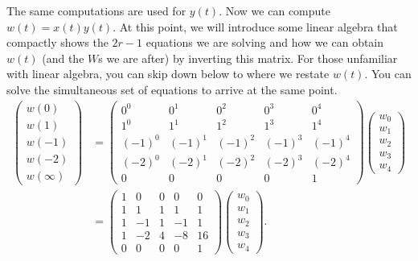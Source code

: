\documentclass[psamsfonts,reqno]{amsart}
\theoremstyle{definition}
\theoremstyle{remark}
\numberwithin{equation}{section}
\begin{document}
The same computations are used for $y(t)$. Now we can compute $w(t) = x(t)y(t)$. At this point, we will introduce some linear algebra that compactly shows the $2r-1$ equations we are solving and how we can obtain $w(t)$ (and the $W$s we are after) by inverting this matrix. For those unfamiliar with linear algebra, you can skip down below to where we restate $w(t)$. You can solve the simultaneous set of equations to arrive at the same point.
\begin{align*}
	\begin{pmatrix}
		w(0) \\ 
		w(1) \\
		w(-1) \\
		w(-2) \\
		w(\infty)
	\end{pmatrix}
	&=
	\begin{pmatrix}
		0^0 & 0^1 & 0^2 & 0^3 & 0^4 \\
		1^0 & 1^1 & 1^2 & 1^3 & 1^4 \\
		(-1)^0 & (-1)^1 & (-1)^2 & (-1)^3 & (-1)^4 \\
		(-2)^0 & (-2)^1 & (-2)^2 & (-2)^3 & (-2)^4 \\
		0 & 0 & 0 & 0 & 1
	\end{pmatrix}
	\begin{pmatrix}
		w_0 \\
		w_1 \\
		w_2 \\
		w_3 \\
		w_4
	\end{pmatrix}
	\\
	&=
	\begin{pmatrix}
		1 & 0 & 0 & 0 & 0 \\
		1 & 1 & 1 & 1 & 1 \\
		1 & -1 & 1 & -1 & 1 \\
		1 & -2 & 4 & -8 & 16 \\
		0 & 0 & 0 & 0 & 1
	\end{pmatrix}
	\begin{pmatrix}
		w_0 \\
		w_1 \\
		w_2 \\
		w_3 \\
		w_4		
	\end{pmatrix}
	.
\end{align*}
\end{document}
